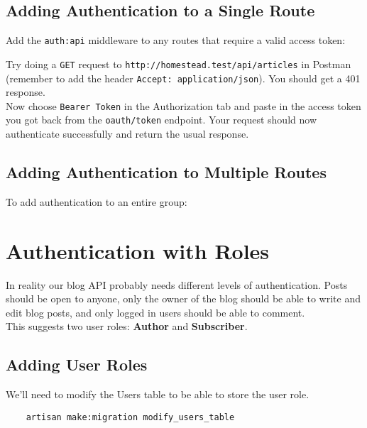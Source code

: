 \subsection{Adding Authentication to a Single Route}

Add the \texttt{auth:api} middleware to any routes that require a valid access token:


Try doing a \texttt{GET} request to \texttt{http://homestead.test/api/articles} in Postman (remember to add the header \texttt{Accept: application/json}). You should get a 401 response.
\\

Now choose \texttt{Bearer Token} in the Authorization tab and paste in the access token you got back from the \texttt{oauth/token} endpoint. Your request should now authenticate successfully and return the usual response.

\subsection{Adding Authentication to Multiple Routes}

To add authentication to an entire group:




\section{Authentication with Roles}

In reality our blog API probably needs different levels of authentication. Posts should be open to anyone, only the owner of the blog should be able to write and edit blog posts, and only logged in users should be able to comment.
\\

This suggests two user roles: \textbf{Author} and \textbf{Subscriber}.


\subsection{Adding User Roles}

We'll need to modify the Users table to be able to store the user role.

\begin{verbatim}
    artisan make:migration modify_users_table
\end{verbatim}

